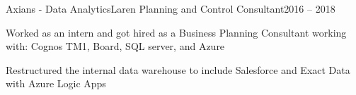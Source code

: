\resumeSubheading
  {Axians - Data Analytics}{Laren}
  {Planning and Control Consultant}{2016 – 2018}
  \vspace{-2.0mm}
  \resumeItemListStart
\item Worked as an intern and got hired as a Business Planning Consultant working with: Cognos TM1, Board, SQL server, and Azure
\item Restructured the internal data warehouse to include Salesforce and Exact Data with Azure Logic Apps
  \resumeItemListEnd 
